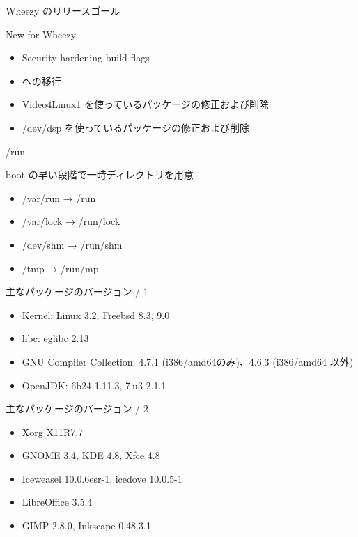 \begin{frame}{Wheezy のリリースゴール}

New for Wheezy
\begin{itemize}

  \item Security hardening build flags
  \item {\color{red}{/run} への移行}
  \item Video4Linux1 を使っているパッケージの修正および削除
  \item /dev/dsp を使っているパッケージの修正および削除

\end{itemize}

\end{frame}


\begin{frame}{/run}

boot の早い段階で一時ディレクトリを用意
\begin{itemize}
  \item /var/run → /run
  \item /var/lock → /run/lock
  \item /dev/shm → /run/shm
  \item /tmp → /run/mp
\end{itemize}

\end{frame}

\begin{frame}
\begin{center}
\end{center}
\end{frame}

\begin{frame}{主なパッケージのバージョン / 1}

\begin{itemize}
  \item Kernel: Linux 3.2, Freebsd 8.3, 9.0
  \item libc: eglibc 2.13
  \item GNU Compiler Collection: 4.7.1 (i386/amd64のみ)、4.6.3 (i386/amd64 以外)
  \item OpenJDK: 6b24-1.11.3, 7$~$u3-2.1.1
\end{itemize}

\end{frame}

\begin{frame}{主なパッケージのバージョン / 2}

\begin{itemize}
  \item  Xorg X11R7.7
  \item  GNOME 3.4, KDE 4.8, Xfce 4.8
  \item  Iceweasel 10.0.6esr-1, icedove 10.0.5-1
  \item  LibreOffice 3.5.4
  \item  GIMP 2.8.0, Inkscape 0.48.3.1
\end{itemize}

\end{frame}

